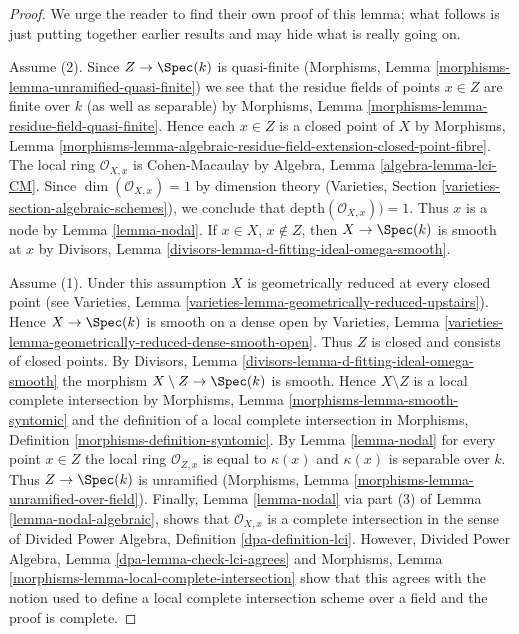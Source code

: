 \begin{proof}
We urge the reader to find their own proof of
this lemma; what follows is just putting together earlier results
and may hide what is really going on.

\medskip\noindent
Assume (2). Since $Z \to \Spec(k)$ is quasi-finite
(Morphisms, Lemma \ref{morphisms-lemma-unramified-quasi-finite})
we see that the residue fields of points $x \in Z$ are finite
over $k$ (as well as separable) by
Morphisms, Lemma \ref{morphisms-lemma-residue-field-quasi-finite}.
Hence each $x \in Z$ is a closed point of $X$ by
Morphisms, Lemma
\ref{morphisms-lemma-algebraic-residue-field-extension-closed-point-fibre}.
The local ring $\mathcal{O}_{X, x}$ is Cohen-Macaulay by
Algebra, Lemma \ref{algebra-lemma-lci-CM}.
Since $\dim(\mathcal{O}_{X, x}) = 1$ by dimension theory
(Varieties, Section \ref{varieties-section-algebraic-schemes}), we conclude
that $\text{depth}(\mathcal{O}_{X, x})) = 1$. Thus $x$ is a node
by Lemma \ref{lemma-nodal}. If $x \in X$, $x \not \in Z$, then
$X \to \Spec(k)$ is smooth at $x$ by
Divisors, Lemma \ref{divisors-lemma-d-fitting-ideal-omega-smooth}.

\medskip\noindent
Assume (1). Under this assumption $X$ is geometrically reduced
at every closed point (see
Varieties, Lemma \ref{varieties-lemma-geometrically-reduced-upstairs}).
Hence $X \to \Spec(k)$ is smooth on a dense open by
Varieties, Lemma \ref{varieties-lemma-geometrically-reduced-dense-smooth-open}.
Thus $Z$ is closed and consists of closed points.
By Divisors, Lemma \ref{divisors-lemma-d-fitting-ideal-omega-smooth}
the morphism $X \setminus Z \to \Spec(k)$ is smooth.
Hence $X \setminus Z$ is a local complete intersection by
Morphisms, Lemma \ref{morphisms-lemma-smooth-syntomic}
and the definition of a local complete intersection in
Morphisms, Definition \ref{morphisms-definition-syntomic}.
By Lemma \ref{lemma-nodal} for every point $x \in Z$
the local ring $\mathcal{O}_{Z, x}$ is equal to $\kappa(x)$
and $\kappa(x)$ is separable over $k$. Thus $Z \to \Spec(k)$
is unramified (Morphisms, Lemma \ref{morphisms-lemma-unramified-over-field}).
Finally, Lemma \ref{lemma-nodal} via part (3) of
Lemma \ref{lemma-nodal-algebraic}, shows that $\mathcal{O}_{X, x}$
is a complete intersection in the sense of
Divided Power Algebra, Definition \ref{dpa-definition-lci}.
However, Divided Power Algebra, Lemma \ref{dpa-lemma-check-lci-agrees}
and Morphisms, Lemma \ref{morphisms-lemma-local-complete-intersection}
show that this agrees with the notion used to define a local
complete intersection scheme over a field and the proof is complete.
\end{proof}





